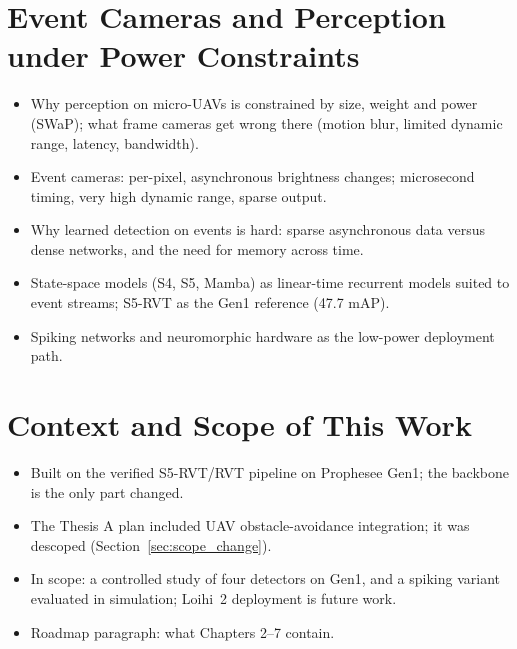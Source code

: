\documentclass[11pt, a4paper]{report}
\begin{document}
\section{Event Cameras and Perception under Power Constraints}
\begin{itemize}
  \item Why perception on micro-UAVs is constrained by size, weight and power (SWaP); what frame cameras get wrong there (motion blur, limited dynamic range, latency, bandwidth).
  \item Event cameras: per-pixel, asynchronous brightness changes; microsecond timing, very high dynamic range, sparse output.
  \item Why learned detection on events is hard: sparse asynchronous data versus dense networks, and the need for memory across time.
  \item State-space models (S4, S5, Mamba) as linear-time recurrent models suited to event streams; S5-RVT as the Gen1 reference (47.7 mAP).
  \item Spiking networks and neuromorphic hardware as the low-power deployment path.
\end{itemize}

\section{Context and Scope of This Work}
\label{sec:scope}
\begin{itemize}
  \item Built on the verified S5-RVT/RVT pipeline on Prophesee Gen1; the backbone is the only part changed.
  \item The Thesis A plan included UAV obstacle-avoidance integration; it was descoped (Section~\ref{sec:scope_change}).
  \item In scope: a controlled study of four detectors on Gen1, and a spiking variant evaluated in simulation; Loihi~2 deployment is future work.
  \item Roadmap paragraph: what Chapters 2--7 contain.
\end{itemize}
\end{document}
